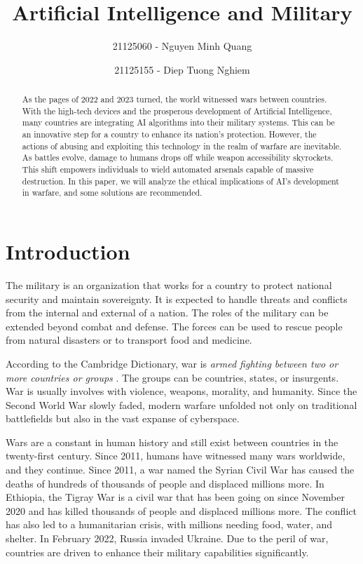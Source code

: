 \documentclass{article}
\title{Artificial Intelligence and Military}
\author[1,*]{21125060 - Nguyen Minh Quang}
\author[2,*]{21125155 - Diep Tuong Nghiem}
\affil[*]{VNUHCM - University of Science}
\affil[1]{nmquang21@apcs.fitus.edu.vn}
\affil[2]{dtnghiem21@apcs.fitus.edu.vn}
\date{}
\begin{document}
\maketitle

\begin{abstract}
As the pages of 2022 and 2023 turned, the world witnessed wars between countries. With the high-tech devices and the prosperous development of Artificial Intelligence, many countries are integrating AI algorithms into their military systems. This can be an innovative step for a country to enhance its nation's protection. However, the actions of abusing and exploiting this technology in the realm of warfare are inevitable. As battles evolve, damage to humans drops off while weapon accessibility skyrockets. This shift empowers individuals to wield automated arsenals capable of massive destruction. In this paper, we will analyze the ethical implications of AI's development in warfare, and some solutions are recommended.
\end{abstract}

\section{Introduction}
The military is an organization that works for a country to protect national security and maintain sovereignty. It is expected to handle threats and conflicts from the internal and external of a nation. The roles of the military can be extended beyond combat and defense. The forces can be used to rescue people from natural disasters or to transport food and medicine.

According to the Cambridge Dictionary, war is \textit{armed fighting between two or more countries or groups} \cite{war-def-cambridge}. The groups can be countries, states, or insurgents. War is usually involves with violence, weapons, morality, and humanity. Since the Second World War slowly faded, modern warfare unfolded not only on traditional battlefields but also in the vast expanse of cyberspace.

Wars are a constant in human history and still exist between countries in the twenty-first century. Since 2011, humans have witnessed many wars worldwide, and they continue. Since 2011, a war named the Syrian Civil War has caused the deaths of hundreds of thousands of people and displaced millions more. In Ethiopia, the Tigray War is a civil war that has been going on since November 2020 and has killed thousands of people and displaced millions more. The conflict has also led to a humanitarian crisis, with millions needing food, water, and shelter. In February 2022, Russia invaded Ukraine. Due to the peril of war, countries are driven to enhance their military capabilities significantly.
\end{document}

